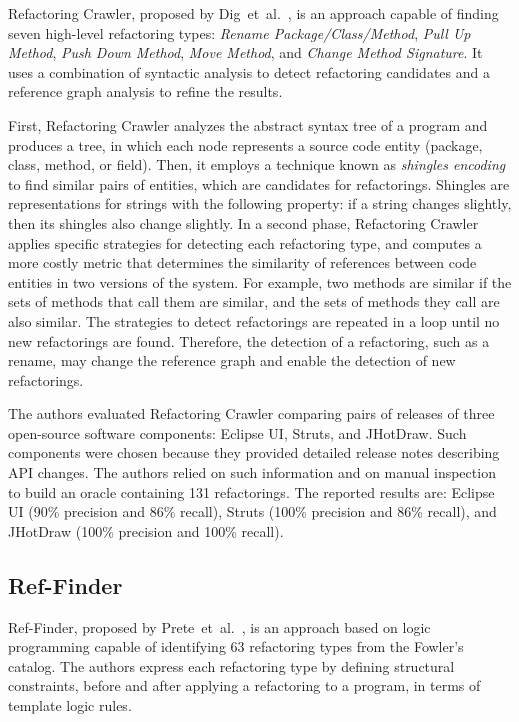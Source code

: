 Refactoring Crawler, proposed by Dig~et~al.~\cite{dig2006automated}, is an approach capable of finding seven high-level refactoring types: \emph{Rename Package/Class/Method}, \emph{Pull Up Method}, \emph{Push Down Method}, \emph{Move Method}, and \emph{Change Method Signature}.
It uses a combination of syntactic analysis to detect refactoring candidates and a reference graph analysis to refine the results.

First, Refactoring Crawler analyzes the abstract syntax tree of a program and produces a tree, in which each node represents a source code entity (package, class, method, or field).
Then, it employs a technique known as \emph{shingles encoding} to find 
similar pairs of entities, which are candidates for refactorings.
Shingles are representations for strings with the following property: if a string changes slightly, then its shingles also change slightly.
In a second phase, Refactoring Crawler applies specific strategies for detecting each refactoring type, and computes a more costly metric that determines the similarity of references between code entities in two versions of the system. For example, two methods are similar if the sets of methods that call them are similar, and the sets of methods they call are also similar.
The strategies to detect refactorings are repeated in a loop until no new refactorings are found. Therefore, the detection of a refactoring, such as a rename, may change the reference graph and enable the detection of new refactorings.

The authors evaluated Refactoring Crawler comparing pairs of releases of three open-source software components: Eclipse UI, Struts, and JHotDraw. Such components were chosen because they provided detailed release notes describing API changes. The authors relied on such information and on manual inspection to build an oracle
containing 131 refactorings.
The reported results are: Eclipse UI (90\% precision and 86\% recall), Struts (100\% precision and 86\% recall), and JHotDraw (100\% precision and 100\% recall).

\subsection{Ref-Finder}

Ref-Finder, proposed by Prete~et~al.~\cite{prete2010template,Kim:2010:RefFinder}, is an approach based on logic programming capable of identifying 63 refactoring types from the Fowler's catalog\cite{Fowler:1999}.
The authors express each refactoring type by defining structural constraints, before and after applying a refactoring to a program, in terms of template logic rules.


